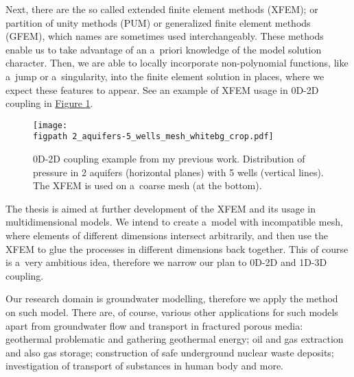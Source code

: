 \documentclass[bibliography=totocnumbered,dvipsnames,FM,Dis]{tulthesis}
\newcommand{\fig}[1]{\hyperref[#1]{Figure \ref{#1}}}
\newcommand{\figpath}{figures/}
\begin{document}
Next, there are the so called extended finite element methods (XFEM); or partition of unity methods (PUM) or generalized
finite element methods (GFEM), which names are sometimes used interchangeably. 
These methods enable us to take advantage of an a~priori knowledge of the model solution character.
Then, we are able to locally incorporate non-polynomial functions, like a~jump or a~singularity, into the finite element solution
 in places, where we expect these features to appear. See an example of XFEM usage in 0D-2D coupling in \fig{fig:aquifers}.
\begin{figure}[!htb]
  \centering    
    \texttt{[image: \\figpath 2\_aquifers-5\_wells\_mesh\_whitebg\_crop.pdf]}
  \caption{0D-2D coupling example from my previous work. Distribution of pressure in 2 aquifers (horizontal planes) with 5 wells 
          (vertical lines). The XFEM is used on a~coarse mesh (at the bottom). }
  \label{fig:aquifers}
\end{figure}

The thesis is aimed at further development of the XFEM and its usage in multidimensional models. 
We intend to create a~model with incompatible mesh, where elements of different dimensions intersect
arbitrarily, and then use the XFEM to glue the processes in different dimensions back together. 
This of course is a~very ambitious idea, therefore we narrow our plan to 0D-2D and 1D-3D coupling. 

Our research domain is groundwater modelling, therefore we apply the method on such model.
There are, of course, various other applications for such models apart from groundwater flow and transport in fractured porous media:
geothermal problematic and gathering geothermal energy; oil and gas extraction and also gas storage;
construction of safe underground nuclear waste deposits; investigation of transport of substances in human body
and more.


\end{document}
